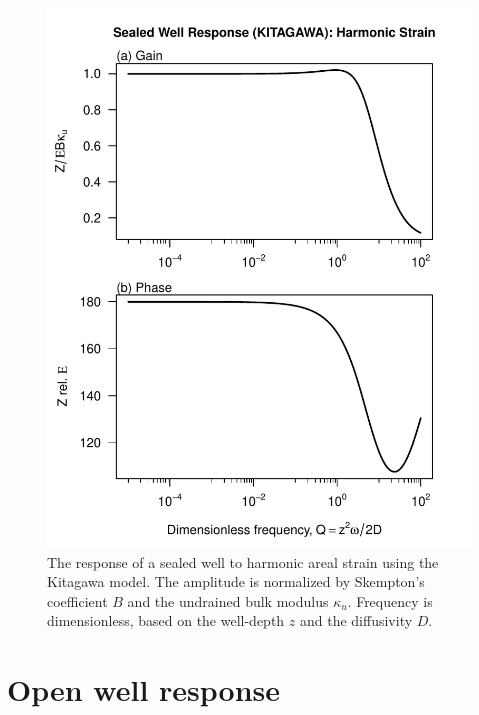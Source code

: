 \documentclass[12pt]{article}\usepackage[]{graphicx}\usepackage[]{color}
\makeatletter
\def\maxwidth{ %
  \ifdim\Gin@nat@width>\linewidth
    \linewidth
  \else
    \Gin@nat@width
  \fi
}
\newenvironment{knitrout}{}{} %
\makeatother
\begin{document}
\begin{figure}[htb!]
\begin{center}
\begin{knitrout}\small
{}\color{fgcolor}
\includegraphics[width=\maxwidth]{figure/KITRESPFIG-1} 

\end{knitrout}
\caption{The response of a sealed well to harmonic areal strain using
the Kitagawa model. The amplitude is normalized by Skempton's coefficient $B$
and the undrained bulk modulus $\kappa_u$.
Frequency is dimensionless, based on the well-depth $z$ and the diffusivity $D$.
}
\label{fig:wrsp}
\end{center}
\end{figure}

\clearpage
\section{Open well response}
\end{document}
